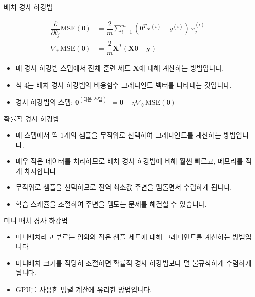 \documentclass{beamer}
\numberwithin{equation}{section}
\begin{document}
\begin{frame}{배치 경사 하강법}

\begin{equation}
\begin{split}
\dfrac{\partial}{\partial \theta_j} \text{MSE}(\boldsymbol{\theta}) &= \dfrac{2}{m}\sum\limits_{i=1}^{m}(\boldsymbol{\theta}^T \mathbf{x}^{(i)} - y^{(i)})\, x_j^{(i)} \\
\nabla_{\boldsymbol{\theta}}\, \text{MSE}(\boldsymbol{\theta}) &= \dfrac{2}{m} \mathbf{X}^T (\mathbf{X} \boldsymbol{\theta} - \mathbf{y})
\end{split}
\end{equation}

\begin{itemize}
\item 매 경사 하강법 스텝에서 전체 훈련 세트 $\mathbf{X}$에 대해 계산하는 방법입니다.
\vskip 0.25cm
\item 식 4는 배치 경사 하강법의 비용함수 그레디언트 벡터를 나타내는 것입니다.
\vskip 0.25cm
\item 경사 하강법의 스텝: $\boldsymbol{\theta}^{(\text{다음 스텝})}\,\,\, = \boldsymbol{\theta} - \eta \nabla_{\boldsymbol{\theta}}\, \text{MSE}(\boldsymbol{\theta})$
\end{itemize}

\end{frame}


\begin{frame}{확률적 경사 하강법}

\begin{itemize}
\item 매 스텝에서 딱 1개의 샘플을 무작위로 선택하여 그래디언트를 계산하는 방법입니다.
\vskip 0.25cm
\item 매우 적은 데이터를 처리하므로 배치 경사 하강법에 비해 훨씬 빠르고, 메모리를 적게 차지합니다.
\vskip 0.25cm
\item 무작위로 샘플을 선택하므로 전역 최소값 주변을 맴돌면서 수렵하게 됩니다.
\vskip 0.25cm
\item 학습 스케쥴을 조절하여 주변을 맴도는 문제를 해결할 수 있습니다.
\end{itemize}

\end{frame}


\begin{frame}{미니 배치 경사 하강법}

\begin{itemize}
\item 미니배치라고 부르는 임의의 작은 샘플 세트에 대해 그래디언트를 계산하는 방법입니다.
\vskip 0.25cm
\item 미니배치 크기를 적당히 조절하면 확률적 경사 하강법보다 덜 불규칙하게 수렴하게 됩니다.
\vskip 0.25cm
\item GPU를 사용한 병렬 계산에 유리한 방법입니다.
\end{itemize}
    
\end{frame}
    
\end{document}
